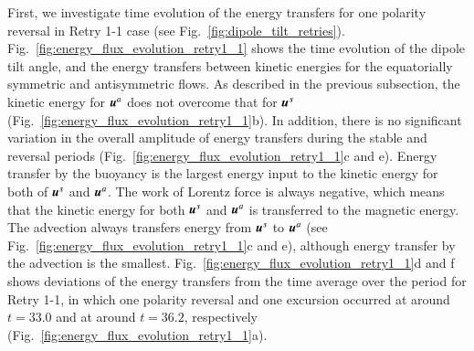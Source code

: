 First, we investigate time evolution of the energy transfers for one polarity reversal in Retry 1-1 case (see Fig.~\ref{fig:dipole_tilt_retries}). 
{\color{red}
Fig.~\ref{fig:energy_flux_evolution_retry1_1} shows the time evolution of the dipole tilt angle, and the energy transfers between kinetic energies for the equatorially symmetric and antisymmetric flows.
 As described in the previous subsection, the kinetic energy for $\mbox{\boldmath$u$}^a$ does not overcome that for $\mbox{\boldmath$u$}^s$ (Fig.~\ref{fig:energy_flux_evolution_retry1_1}b).
In addition, there is no significant variation in the overall amplitude of energy transfers during the stable and reversal periods (Fig.~\ref{fig:energy_flux_evolution_retry1_1}c and e).
Energy transfer by the buoyancy is the largest energy input to the kinetic energy for both of $\mbox{\boldmath$u$}^s$ and $\mbox{\boldmath$u$}^a$.
The work of Lorentz force is always negative, which means that the kinetic energy for both $\mbox{\boldmath$u$}^s$ and $\mbox{\boldmath$u$}^a$ is transferred to the magnetic energy.
The advection always transfers energy from $\mbox{\boldmath$u$}^s$ to $\mbox{\boldmath$u$}^a$ (see Fig.~\ref{fig:energy_flux_evolution_retry1_1}c and e), although energy transfer by the advection is the smallest.
Fig.~\ref{fig:energy_flux_evolution_retry1_1}d and f shows deviations of the energy transfers from the time average over the period for Retry 1-1, in which one polarity reversal and one excursion occurred at around $t = 33.0$ and at around $t = 36.2$, respectively (Fig.~\ref{fig:energy_flux_evolution_retry1_1}a).
}
